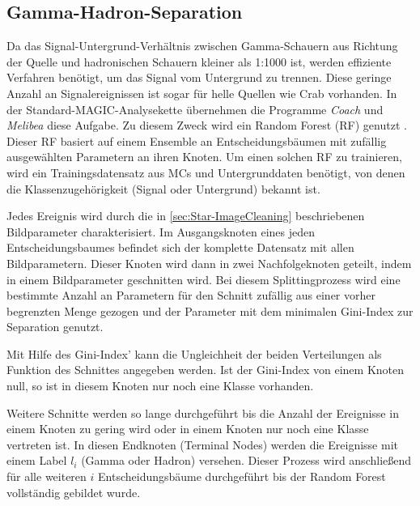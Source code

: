 \subsection{Gamma-Hadron-Separation}
Da das Signal-Untergrund-Verhältnis zwischen Gamma-Schauern aus Richtung der Quelle und hadronischen Schauern kleiner als 1:1000 ist, werden effiziente Verfahren benötigt, um das Signal vom Untergrund zu trennen.\cite{Bock}
Diese geringe Anzahl an Signalereignissen ist sogar für helle Quellen wie Crab vorhanden.
In der Standard-MAGIC-Analysekette übernehmen die Programme \textit{Coach} und \textit{Melibea} diese Aufgabe. 
Zu diesem Zweck wird ein Random Forest (RF) genutzt \cite{RandomForestForMAGIC}.
Dieser RF basiert auf einem Ensemble an Entscheidungsbäumen mit zufällig ausgewählten Parametern an ihren Knoten.
Um einen solchen RF zu trainieren, wird ein Trainingsdatensatz aus MCs und Untergrunddaten benötigt, von denen die Klassenzugehörigkeit (Signal oder Untergrund) bekannt ist.

Jedes Ereignis wird durch die in \autoref{sec:Star-ImageCleaning} beschriebenen Bildparameter charakterisiert.
Im Ausgangsknoten eines jeden Entscheidungsbaumes befindet sich der komplette Datensatz mit allen Bildparametern.
Dieser Knoten wird dann in zwei Nachfolgeknoten geteilt, indem in einem Bildparameter geschnitten wird.
Bei diesem Splittingprozess wird eine bestimmte Anzahl an Parametern für den Schnitt zufällig aus einer vorher begrenzten Menge gezogen und der Parameter mit dem minimalen Gini-Index zur Separation genutzt.\cite{RandomForestForMAGIC}

Mit Hilfe des Gini-Index' kann die Ungleichheit der beiden Verteilungen als Funktion des Schnittes angegeben werden.
Ist der Gini-Index von einem Knoten null, so ist in diesem Knoten nur noch eine Klasse vorhanden.\cite{RandomForestForMAGIC}

Weitere Schnitte werden so lange durchgeführt bis die Anzahl der Ereignisse in einem Knoten zu gering wird oder in einem Knoten nur noch eine Klasse vertreten ist.
In diesen Endknoten (Terminal Nodes) werden die Ereignisse mit einem Label $l_i$ (Gamma oder Hadron) versehen. 
Dieser Prozess wird anschließend für alle weiteren $i$ Entscheidungsbäume durchgeführt bis der Random Forest vollständig gebildet wurde.\cite{RandomForestForMAGIC}

